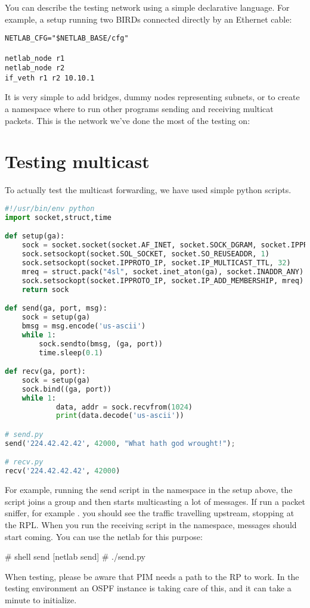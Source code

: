 You can describe the testing network using a simple declarative language. For
example, a setup running two BIRDs connected directly by an Ethernet cable:

\begin{lstlisting}
NETLAB_CFG="$NETLAB_BASE/cfg"

netlab_node r1
netlab_node r2
if_veth r1 r2 10.10.1
\end{lstlisting}

It is very simple to add bridges, dummy nodes representing subnets, or to
create a namespace where to run other programs sending and receiving multicat
packets. This is the network we've done the most of the testing on:

\begin{figure}[htp]
\centering
\vskip 10cm
\caption{}
\label{pim-channels}
\end{figure}

\section{Testing multicast}
To actually test the multicast forwarding, we have used simple python scripts.

\begin{lstlisting}[language=python]
#!/usr/bin/env python
import socket,struct,time

def setup(ga):
    sock = socket.socket(socket.AF_INET, socket.SOCK_DGRAM, socket.IPPROTO_UDP)
    sock.setsockopt(socket.SOL_SOCKET, socket.SO_REUSEADDR, 1)
    sock.setsockopt(socket.IPPROTO_IP, socket.IP_MULTICAST_TTL, 32)
    mreq = struct.pack("4sl", socket.inet_aton(ga), socket.INADDR_ANY)
    sock.setsockopt(socket.IPPROTO_IP, socket.IP_ADD_MEMBERSHIP, mreq)
    return sock

def send(ga, port, msg):
    sock = setup(ga)
    bmsg = msg.encode('us-ascii')
    while 1:
        sock.sendto(bmsg, (ga, port))
        time.sleep(0.1)

def recv(ga, port):
    sock = setup(ga)
    sock.bind((ga, port))
    while 1:
            data, addr = sock.recvfrom(1024)
            print(data.decode('us-ascii'))

# send.py
send('224.42.42.42', 42000, "What hath god wrought!");

# recv.py
recv('224.42.42.42', 42000)
\end{lstlisting}

For example, running the send script in the  namespace in the setup
above, the script joins a group and then starts multicasting a lot of messages.
If run a packet sniffer, for example . you should see the traffic
travelling upstream, stopping at the RPL. When you run the receiving script in
the  namespace, messages should start coming. You can use the netlab
for this purpose:

\begin{code}
[netlab] # shell send
[netlab send] # ./send.py
\end{code}

When testing, please be aware that PIM needs a path to the RP to work. In the
testing environment an OSPF instance is taking care of this, and it can take
a minute to initialize.
